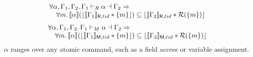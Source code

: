 \[\begin{array}{l}
\forall \alpha,\Gamma_1,\Gamma_2\ldotp \Gamma_1\vdash_R\alpha\dashv\Gamma_2 \Rightarrow
\\
\quad\forall m\ldotp   \llbracket \alpha \rrbracket  (\lfloor \llbracket \Gamma_{1} \rrbracket_{\textsf{R},tid}  * \{m\} \rfloor )\subseteq  \lfloor \llbracket \Gamma_{2} \rrbracket_{\textsf{R},tid} * \mathcal{R}(\{m\}) \rfloor
\end{array}\]
\[
\begin{array}{l}
\forall \alpha,\Gamma_1,\Gamma_2\ldotp \Gamma_1\vdash_M\alpha\dashv\Gamma_2 \Rightarrow
\\
\quad\forall m\ldotp   \llbracket \alpha \rrbracket  (\lfloor \llbracket \Gamma_{1} \rrbracket_{\textsf{M},tid}  * \{m\} \rfloor )\subseteq  \lfloor \llbracket \Gamma_{2} \rrbracket_{\textsf{M},tid} * \mathcal{R}(\{m\}) \rfloor
\end{array}
\]
$\alpha$ ranges over any atomic command, such as a field access or variable assignment.

